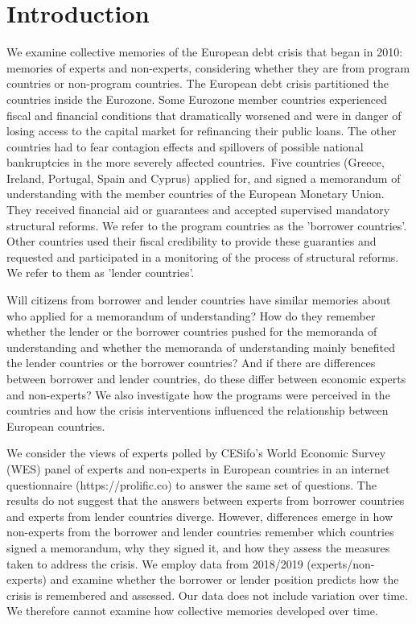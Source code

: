 \section{Introduction}

We examine collective memories of the European debt crisis that
began in 2010: memories of experts and non-experts, considering whether they are from program countries or non-program countries.
The European debt crisis partitioned the countries inside the Eurozone. Some
Eurozone member countries experienced fiscal and financial conditions that
dramatically worsened and were in danger of losing access to the capital
market for refinancing their public loans. The other countries had to
fear contagion effects and spillovers of possible national
bankruptcies in the more severely affected countries.\ Five countries
(Greece, Ireland, Portugal, Spain and Cyprus) applied for, and signed a
memorandum of understanding with the member countries of the European
Monetary Union. They received financial aid or
guarantees and accepted supervised mandatory structural reforms. We refer to the program
countries as the 'borrower countries'. Other countries used their fiscal credibility to provide these guaranties and requested
and participated in a monitoring of the process of structural reforms. We
refer to them as 'lender countries'.

Will citizens from borrower and lender countries have similar memories about who
applied for a memorandum of understanding? How do they remember
whether the lender or the borrower countries pushed for the memoranda of understanding and whether
the memoranda of understanding mainly benefited the lender countries or the
borrower countries? And if there are differences between borrower and lender countries, do these differ between economic experts and non-experts? We also
investigate how the programs were perceived in the countries
and how the crisis interventions influenced the relationship between European
countries.\ 

We consider the views of experts polled by CESifo's World Economic Survey (WES) panel of experts and non-experts in European countries in an internet questionnaire (https://prolific.co) to answer the same set of questions. The results do not suggest that the answers between experts from borrower countries and experts from lender countries diverge. However, differences emerge in how non-experts from the borrower and lender countries remember which countries signed a memorandum, why they signed it, and how they assess the measures taken to address the crisis. We employ data from 2018/2019 (experts/non-experts) and examine whether the borrower or lender position predicts how the crisis is remembered and assessed. Our data does not include variation over time. We therefore cannot examine how collective memories developed over time.

